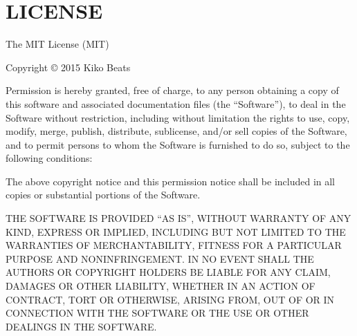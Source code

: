\chapter{LICENSE}
\hypertarget{md_pkiclassroomrescheduler_2src_2main_2frontend_2node__modules_2emojis-list_2_l_i_c_e_n_s_e}{}\label{md_pkiclassroomrescheduler_2src_2main_2frontend_2node__modules_2emojis-list_2_l_i_c_e_n_s_e}
The MIT License (MIT)

Copyright © 2015 Kiko Beats

Permission is hereby granted, free of charge, to any person obtaining a copy of this software and associated documentation files (the “\+Software”), to deal in the Software without restriction, including without limitation the rights to use, copy, modify, merge, publish, distribute, sublicense, and/or sell copies of the Software, and to permit persons to whom the Software is furnished to do so, subject to the following conditions\+:

The above copyright notice and this permission notice shall be included in all copies or substantial portions of the Software.

THE SOFTWARE IS PROVIDED “\+AS IS”, WITHOUT WARRANTY OF ANY KIND, EXPRESS OR IMPLIED, INCLUDING BUT NOT LIMITED TO THE WARRANTIES OF MERCHANTABILITY, FITNESS FOR A PARTICULAR PURPOSE AND NONINFRINGEMENT. IN NO EVENT SHALL THE AUTHORS OR COPYRIGHT HOLDERS BE LIABLE FOR ANY CLAIM, DAMAGES OR OTHER LIABILITY, WHETHER IN AN ACTION OF CONTRACT, TORT OR OTHERWISE, ARISING FROM, OUT OF OR IN CONNECTION WITH THE SOFTWARE OR THE USE OR OTHER DEALINGS IN THE SOFTWARE. 